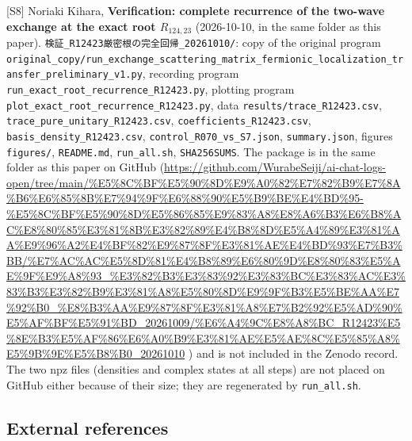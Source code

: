 \documentclass[
  a4paper,
]{article}
\begin{document}
{[}S8{]} Noriaki Kihara, \textbf{Verification: complete recurrence of
the two-wave exchange at the exact root \(R_{124,23}\)} (2026-10-10, in
the same folder as this paper).
\texttt{検証\_\allowbreak{}R12423厳密根の完全回帰\_\allowbreak{}20261010/\allowbreak{}}: copy of the original
program
\texttt{original\_\allowbreak{}copy/\allowbreak{}run\_\allowbreak{}exchange\_\allowbreak{}scattering\_\allowbreak{}matrix\_\allowbreak{}fermionic\_\allowbreak{}localization\_\allowbreak{}transfer\_\allowbreak{}preliminary\_\allowbreak{}v1.py},
recording program \texttt{run\_\allowbreak{}exact\_\allowbreak{}root\_\allowbreak{}recurrence\_\allowbreak{}R12423.py},
plotting program \texttt{plot\_\allowbreak{}exact\_\allowbreak{}root\_\allowbreak{}recurrence\_\allowbreak{}R12423.py}, data
\texttt{results/\allowbreak{}trace\_\allowbreak{}R12423.csv},
\texttt{trace\_\allowbreak{}pure\_\allowbreak{}unitary\_\allowbreak{}R12423.csv},
\texttt{coefficients\_\allowbreak{}R12423.csv}, \texttt{basis\_\allowbreak{}density\_\allowbreak{}R12423.csv},
\texttt{control\_\allowbreak{}R070\_\allowbreak{}vs\_\allowbreak{}S7.json}, \texttt{summary.json}, figures
\texttt{figures/\allowbreak{}}, \texttt{README.md}, \texttt{run\_\allowbreak{}all.sh},
\texttt{SHA256SUMS}. The package is in the same folder as this paper on
GitHub
(\url{https://github.com/WurabeSeiji/ai-chat-logs-open/tree/main/\%E5\%8C\%BF\%E5\%90\%8D\%E9\%A0\%82\%E7\%82\%B9\%E7\%8A\%B6\%E6\%85\%8B\%E7\%94\%9F\%E6\%88\%90\%E5\%B9\%BE\%E4\%BD\%95-\%E5\%8C\%BF\%E5\%90\%8D\%E5\%86\%85\%E9\%83\%A8\%E8\%A6\%B3\%E6\%B8\%AC\%E8\%80\%85\%E3\%81\%8B\%E3\%82\%89\%E4\%B8\%8D\%E5\%A4\%89\%E3\%81\%AA\%E9\%96\%A2\%E4\%BF\%82\%E9\%87\%8F\%E3\%81\%AE\%E4\%BD\%93\%E7\%B3\%BB/\%E7\%AC\%AC\%E5\%8D\%81\%E4\%B8\%89\%E6\%80\%9D\%E8\%80\%83\%E5\%AE\%9F\%E9\%A8\%93\_\%E3\%82\%B3\%E3\%83\%92\%E3\%83\%BC\%E3\%83\%AC\%E3\%83\%B3\%E3\%82\%B9\%E3\%81\%A8\%E5\%80\%8D\%E9\%9F\%B3\%E5\%BE\%AA\%E7\%92\%B0\_\%E8\%B3\%AA\%E9\%87\%8F\%E3\%81\%A8\%E7\%B2\%92\%E5\%AD\%90\%E5\%AF\%BF\%E5\%91\%BD\_20261009/\%E6\%A4\%9C\%E8\%A8\%BC\_R12423\%E5\%8E\%B3\%E5\%AF\%86\%E6\%A0\%B9\%E3\%81\%AE\%E5\%AE\%8C\%E5\%85\%A8\%E5\%9B\%9E\%E5\%B8\%B0\_20261010}
) and is not included in the Zenodo record. The two npz files (densities
and complex states at all steps) are not placed on GitHub either because
of their size; they are regenerated by \texttt{run\_\allowbreak{}all.sh}.

\subsection{External references}\label{external-references}
\end{document}
